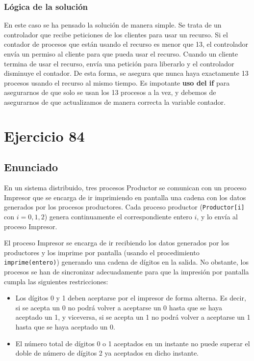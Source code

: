 \documentclass[a4paper,12pt]{article}
\begin{document}
\subsubsection*{Lógica de la solución}

En este caso se ha pensado la solución de manera simple. Se trata de un controlador que recibe peticiones de los clientes para usar un recurso. Si el contador de procesos que están usando el recurso es menor que 13, el controlador envía un permiso al cliente para que pueda usar el recurso. Cuando un cliente termina de usar el recurso, envía una petición para liberarlo y el controlador disminuye el contador. De esta forma, se asegura que nunca haya exactamente 13 procesos usando el recurso al mismo tiempo. Es impotante \textbf{uso del if} para asegurarnos de que solo se usan los 13 procesos a la vez, y debemos de asegurarnos de que actualizamos de manera correcta la variable contador.

\section{Ejercicio 84}

\subsection{Enunciado}

En un sistema distribuido, tres procesos Productor se comunican con un proceso Impresor que se encarga de ir imprimiendo en pantalla una cadena con los datos generados por los procesos productores. Cada proceso productor (\texttt{Productor[i]} con \(i = 0, 1, 2\)) genera continuamente el correspondiente entero \(i\), y lo envía al proceso Impresor.

El proceso Impresor se encarga de ir recibiendo los datos generados por los productores y los imprime por pantalla (usando el procedimiento \texttt{imprime(entero)}) generando una cadena de dígitos en la salida. No obstante, los procesos se han de sincronizar adecuadamente para que la impresión por pantalla cumpla las siguientes restricciones:

\begin{itemize}
    \item Los dígitos 0 y 1 deben aceptarse por el impresor de forma alterna. Es decir, si se acepta un 0 no podrá volver a aceptarse un 0 hasta que se haya aceptado un 1, y viceversa, si se acepta un 1 no podrá volver a aceptarse un 1 hasta que se haya aceptado un 0.
    \item El número total de dígitos 0 o 1 aceptados en un instante no puede superar el doble de número de dígitos 2 ya aceptados en dicho instante.
\end{itemize}
\end{document}
